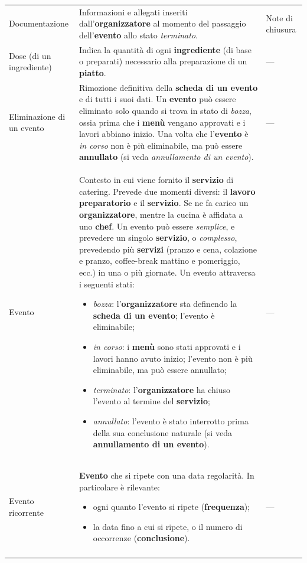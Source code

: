 \begin{longtable}{L{3.5cm} L{8.5cm} L{3cm}}
Documentazione
& Informazioni e allegati inseriti dall'\textbf{organizzatore} al momento
  del passaggio dell'\textbf{evento} allo stato \emph{terminato}.
& Note di chiusura \\
\addlinespace

Dose (di un ingrediente)
& Indica la quantità di ogni \textbf{ingrediente} (di base o preparati)
  necessario alla preparazione di un \textbf{piatto}.
& — \\
\addlinespace

Eliminazione di un evento
& Rimozione definitiva della \textbf{scheda di un evento} e di tutti i suoi
  dati. Un \textbf{evento} può essere eliminato solo quando si trova in
  stato di \emph{bozza}, ossia prima che i \textbf{menù} vengano
  approvati e i lavori abbiano inizio. Una volta che l'\textbf{evento}
  è \emph{in corso} non è più eliminabile, ma può essere
  \textbf{annullato} (si veda \emph{annullamento di un evento}).
& — \\
\addlinespace

Evento
& Contesto in cui viene fornito il \textbf{servizio} di catering. Prevede due
  momenti diversi: il \textbf{lavoro preparatorio} e il \textbf{servizio}.
  Se ne fa carico un \textbf{organizzatore}, mentre la cucina è affidata a
  uno \textbf{chef}.
  Un evento può essere \emph{semplice}, e prevedere un singolo \textbf{servizio},
  o \emph{complesso}, prevedendo più \textbf{servizi} (pranzo e cena, colazione
  e pranzo, coffee-break mattino e pomeriggio, ecc.) in una o più giornate.
  Un evento attraversa i seguenti stati:
  \begin{itemize}[nosep,leftmargin=*]
    \item \emph{bozza}: l'\textbf{organizzatore} sta definendo la
          \textbf{scheda di un evento}; l'evento è eliminabile;
    \item \emph{in corso}: i \textbf{menù} sono stati approvati e i lavori
          hanno avuto inizio; l'evento non è più eliminabile, ma può essere
          annullato;
    \item \emph{terminato}: l'\textbf{organizzatore} ha chiuso l'evento al
          termine del \textbf{servizio};
    \item \emph{annullato}: l'evento è stato interrotto prima della sua
          conclusione naturale (si veda \textbf{annullamento di un evento}).
  \end{itemize}
& — \\
\addlinespace

Evento ricorrente
& \textbf{Evento} che si ripete con una data regolarità. In particolare è
  rilevante:
  \begin{itemize}[nosep,leftmargin=*]
    \item ogni quanto l'evento si ripete (\textbf{frequenza});
    \item la data fino a cui si ripete, o il numero di occorrenze
          (\textbf{conclusione}).
  \end{itemize}
& — \\
\addlinespace


\end{longtable}
